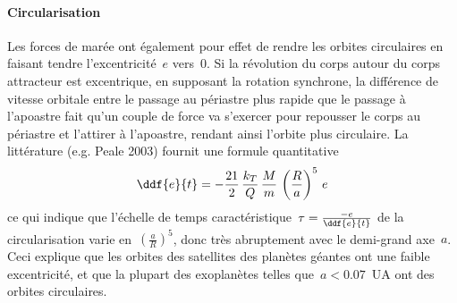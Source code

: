 \sk
\paragraph{Circularisation} Les forces de marée ont également pour effet de rendre les orbites circulaires en faisant tendre l'excentricité~$e$ vers~$0$. Si la révolution du corps autour du corps attracteur est excentrique, en supposant la rotation synchrone, la différence de vitesse orbitale entre le passage au périastre plus rapide que le passage à l'apoastre fait qu'un couple de force va s'exercer pour repousser le corps au périastre et l'attirer à l'apoastre, rendant ainsi l'orbite plus circulaire. La littérature (e.g. Peale 2003) fournit une formule quantitative
\[ \ddf{e}{t} = - \frac{21}{2} \, \frac{k_T}{Q} \, \frac{M}{m} \, \left( \frac{R}{a} \right)^5 \, e  \]
\noindent ce qui indique que l'échelle de temps caractéristique~$\tau = \frac{-e}{\ddf{e}{t}} $ de la circularisation varie en~$\left( \frac{a}{R} \right)^5$, donc très abruptement avec le demi-grand axe~$a$. Ceci explique que les orbites des satellites des planètes géantes ont une faible excentricité, et que la plupart des exoplanètes telles que~$a < 0.07$~UA ont des orbites circulaires.
